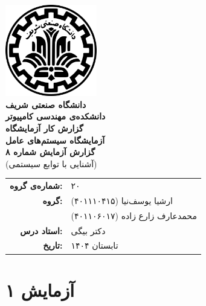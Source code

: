 \documentclass[12pt]{article}
\newcommand{\persianordinal}[1]{%
	\ifcase#1
	\or اول%
	\or دوم%
	\or سوم%
	\or چهارم%
	\or پنجم%
	\or ششم%
	\or هفتم%
	\or هشتم%
	\or نهم%
	\or دهم%
	\or یازدهم%
	\or دوازدهم%
	\or سیزدهم%
	\or چهاردهم%
	\or پانزدهم%
	\or شانزدهم%
	\or هفدهم%
	\or هجدهم%
	\or نوزدهم%
	\or بیستم%
	\else #1\fi
}
\newcommand{\persianordinalpage}{\persianfont\persianordinal{\value{page}}}
\begin{document}
	
	\begin{titlepage}
		\centering
		\vspace*{1cm}
		\includegraphics[width=4cm]{sharif.png}\\[1.5cm]
		{\Large\textbf{دانشگاه صنعتی شریف}}\\[0.5cm]
		{\large\textbf{دانشکده‌ی مهندسی کامپیوتر}}\\[1.5cm]
		{\Huge\textbf{گزارش کار آزمایشگاه}}\\[0.5cm]
		{\LARGE\textbf{آزمایشگاه سیستم‌های عامل}}\\[2cm]
		
		\textbf{گزارش آزمایش شماره ۸}\\
		(آشنایی با توابع سیستمی)
		
		\vfill
		\begin{tabular}{rl}
			\textbf{شماره‌ی گروه:} & ۲۰ \\
			\textbf{گروه:} &
			ارشیا یوسف‌نیا (۴۰۱۱۱۰۴۱۵) \\
			& محمدعارف زارع زاده (۴۰۱۱۰۶۰۱۷) \\
			\textbf{استاد درس:} & دکتر بیگی \\
			\textbf{تاریخ:} & تابستان ۱۴۰۴ \\
		\end{tabular}
	\end{titlepage}
	
	\clearpage
	\setcounter{page}{1}
	\renewcommand{\thepage}{\persianordinalpage}
	
	\tableofcontents
	\clearpage
	\listoffigures
	
	\clearpage
	\setcounter{page}{1}
	\renewcommand{\thepage}{\persianfont\arabic{page}}
	
	
        \section{آزمایش ۱}
\end{document}

